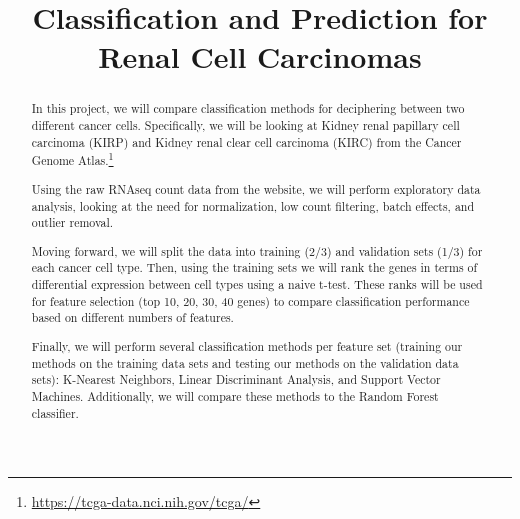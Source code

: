 



\begin{frontmatter}

\title{Classification and Prediction for Renal Cell Carcinomas}




\begin{abstract}

In this project, we will compare classification methods for deciphering between
two different cancer cells. Specifically, we will be looking at Kidney renal
papillary cell carcinoma (KIRP) and Kidney renal clear cell carcinoma (KIRC)
from the Cancer Genome
Atlas.\footnote{\url{https://tcga-data.nci.nih.gov/tcga/}}

Using the raw RNAseq count data from the website, we will perform exploratory
data analysis, looking at the need for normalization, low count filtering,
batch effects, and outlier removal.

Moving forward, we will split the data into training (2/3) and validation sets
(1/3) for each cancer cell type. Then, using the training sets we will rank the
genes in terms of differential expression between cell types using a naive
t-test. These ranks will be used for feature selection (top 10, 20, 30, 40
genes) to compare classification performance based on different numbers of
features.

Finally, we will perform several classification methods per feature set
(training our methods on the training data sets and testing our methods on the
validation data sets): K-Nearest Neighbors, Linear Discriminant Analysis, and
Support Vector Machines.  Additionally, we will compare these methods to the
Random Forest classifier.

 
\end{abstract}

\begin{keyword}
\end{keyword}

\end{frontmatter}



